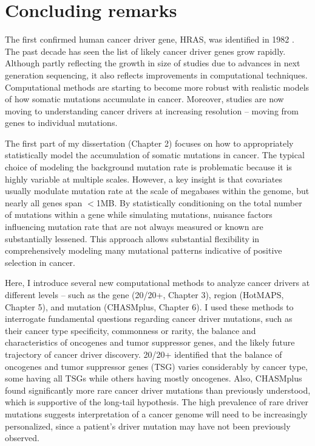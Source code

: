 
\chapter{Concluding remarks}
\label{chap:ch8}

The first confirmed human cancer driver gene, HRAS, was identified in 1982 \cite{RN21, RN19}. The past decade has seen the list of likely cancer driver genes grow rapidly. Although partly reflecting the growth in size of studies due to advances in next generation sequencing, it also reflects improvements in computational techniques. Computational methods are starting to become more robust with realistic models of how somatic mutations accumulate in cancer. Moreover, studies are now moving to understanding cancer drivers at increasing resolution -- moving from genes to individual mutations.

The first part of my dissertation (Chapter 2) focuses on how to appropriately statistically model the accumulation of somatic mutations in cancer. The typical choice of modeling the background mutation rate is problematic because it is highly variable at multiple scales. However, a key insight is that covariates usually modulate mutation rate at the scale of megabases within the genome, but nearly all genes span $<$1MB. By statistically conditioning on the total number of mutations within a gene while simulating mutations, nuisance factors influencing mutation rate that are not always measured or known are substantially lessened. This approach allows substantial flexibility in comprehensively modeling many mutational patterns indicative of positive selection in cancer.

Here, I introduce several new computational methods to analyze cancer drivers at different levels -- such as the gene (20/20+, Chapter 3), region (HotMAPS, Chapter 5), and mutation (CHASMplus, Chapter 6). I used these methods to interrogate fundamental questions regarding cancer driver mutations, such as their cancer type specificity, commonness or rarity, the balance and characteristics of oncogenes and tumor suppressor genes, and the likely future trajectory of cancer driver discovery. 20/20+ identified that the balance of oncogenes and tumor suppressor genes (TSG) varies considerably by cancer type, some having all TSGs while others having mostly oncogenes. Also, CHASMplus found significantly more rare cancer driver mutations than previously understood, which is supportive of the long-tail hypothesis. The high prevalence of rare driver mutations suggests interpretation of a cancer genome will need to be increasingly personalized, since a patient’s driver mutation may have not been previously observed. 

